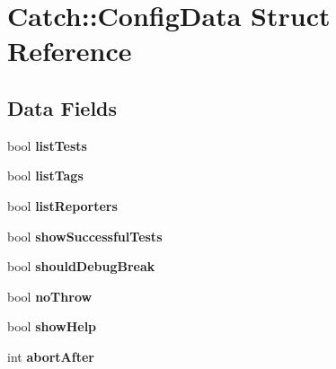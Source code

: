 \hypertarget{structCatch_1_1ConfigData}{}\section{Catch\+:\+:Config\+Data Struct Reference}
\label{structCatch_1_1ConfigData}
\subsection*{Data Fields}
\begin{DoxyCompactItemize}
\item 
bool {\bfseries list\+Tests}\hypertarget{structCatch_1_1ConfigData_a0da0f6d493ef8f799273b4358d420a3a}{}\label{structCatch_1_1ConfigData_a0da0f6d493ef8f799273b4358d420a3a}

\item 
bool {\bfseries list\+Tags}\hypertarget{structCatch_1_1ConfigData_af780422bdef8d8b905204542855cf6b3}{}\label{structCatch_1_1ConfigData_af780422bdef8d8b905204542855cf6b3}

\item 
bool {\bfseries list\+Reporters}\hypertarget{structCatch_1_1ConfigData_a4ba3618cae31b43237724f55359bfe95}{}\label{structCatch_1_1ConfigData_a4ba3618cae31b43237724f55359bfe95}

\item 
bool {\bfseries show\+Successful\+Tests}\hypertarget{structCatch_1_1ConfigData_aeb091ca2df2c654caaa2ad29c14578e5}{}\label{structCatch_1_1ConfigData_aeb091ca2df2c654caaa2ad29c14578e5}

\item 
bool {\bfseries should\+Debug\+Break}\hypertarget{structCatch_1_1ConfigData_afec8310b1904784edb292e143a602fba}{}\label{structCatch_1_1ConfigData_afec8310b1904784edb292e143a602fba}

\item 
bool {\bfseries no\+Throw}\hypertarget{structCatch_1_1ConfigData_a6dd23f8c9d9337f46187e7dbb6a8328e}{}\label{structCatch_1_1ConfigData_a6dd23f8c9d9337f46187e7dbb6a8328e}

\item 
bool {\bfseries show\+Help}\hypertarget{structCatch_1_1ConfigData_a12535241547dfc57e6864c4fc2cd4dd9}{}\label{structCatch_1_1ConfigData_a12535241547dfc57e6864c4fc2cd4dd9}

\item 
int {\bfseries abort\+After}\hypertarget{structCatch_1_1ConfigData_a2d5505751aab745d5ae5e4ffe5c92c35}{}\label{structCatch_1_1ConfigData_a2d5505751aab745d5ae5e4ffe5c92c35}


\end{DoxyCompactItemize}
